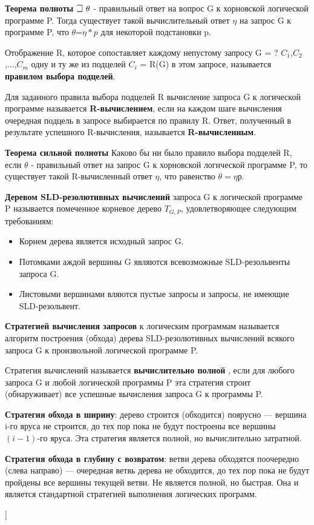 \textbf{Теорема полноты}
$\mathLet ~\theta$ - правильный ответ на вопрос G к хорновской логической программе P. Тогда существует такой вычислительный ответ $\eta$ на запрос G к программе P, что $\theta$=$\eta *p $ для некоторой подстановки p.

Отображение R, которое сопоставляет каждому непустому запросу G = ? $C_{1}$,$C_{2}$,...,$C_{m}$ одну и ту же из подцелей $C_{i}$ = R(G) в этом запросе, называется \textbf{правилом выбора подцелей}. 

Для заданного правила выбора подцелей R вычисление запроса G к логической программе называется \textbf{R-вычислением}, если на каждом шаге вычисления очередная подцель в запросе выбирается по правилу R. 
Ответ, полученный в результате успешного R-вычисления, называется \textbf{R-вычисленным}. 

\textbf{Теорема сильной полноты} Каково бы ни было правило выбора подцелей R, если $\theta$ - правильный ответ на запрос G к хорновской логической программе P, то существует такой R-вычисленный ответ $\eta$, что равенство $\theta = \eta$р. 

\textbf{Деревом SLD-резолютивных вычислений} запроса G к логической программе P называется помеченное корневое дерево $T_{G,P}$, удовлетворяющее следующим требованиям: 
\begin{itemize}
    \item Корнем дерева является исходный запрос G.
    \item Потомками аждой вершины G являются всевозможные SLD-резольвенты запроса G.  
    \item Листовыми вершинами вляются пустые запросы и запросы, не имеющие SLD-резольвент. 
\end{itemize}

\textbf{Стратегией вычисления запросов} к логическим программам называется алгоритм построения (обхода) дерева SLD-резолютивных вычислений всякого запроса G к произвольной логической программе P.

Стратегия вычислений называется \textbf{вычислительно полной} , если для любого запроса G и любой логической программы P эта стратегия строит (обнаруживает) все успешные вычисления запроса G к программы P. 

\textbf{Стратегия обхода в ширину}: дерево строится (обходится) поярусно --- вершина i-го яруса не строится, до тех пор пока не будут построены все вершины $(i - 1)$-го яруса. Эта стратегия является полной, но вычислительно затратной.

\textbf{Стратегия обхода в глубину с возвратом}: ветви дерева обходятся поочередно (слева направо) — очередная ветвь дерева не обходится, до тех пор пока не будут пройдены все вершины текущей ветви. Не является полной, но быстрая. Она и является стандартной стратегией выполнения логических программ.

\bigbreak
[\cite[page 69-96]{replace_me}]
